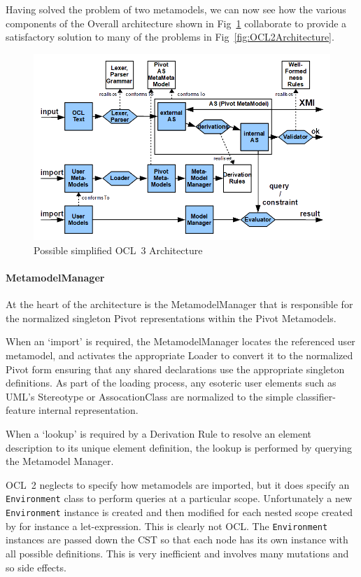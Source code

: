 \documentclass{jot}
\begin{document}
Having solved the problem of two metamodels, we can now see how the various components of the Overall architecture shown in Fig~\ref{fig:OCL3Architecture} collaborate to provide a satisfactory solution to many of the problems in Fig~\ref{fig:OCL2Architecture}. 

\begin{figure}
	\begin{center}
		\includegraphics[width=4.5in]{OCL3Architecture.png}
	\end{center}
	\caption{Possible simplified OCL~3 Architecture}
	\label{fig:OCL3Architecture}
\end{figure}

\paragraph{MetamodelManager}

At the heart of the architecture is the MetamodelManager that is responsible for the normalized singleton Pivot representations within
the Pivot Metamodels.

When an `import' is required, the MetamodelManager locates the referenced user metamodel, and activates the appropriate Loader to convert it to the normalized Pivot form ensuring that any shared declarations use the appropriate singleton definitions. As part of the loading process, any esoteric user elements such as UML's Stereotype or AssocationClass are normalized to the simple classifier-feature internal representation.

When a `lookup' is required by a Derivation Rule to resolve an element description to its unique element definition, the lookup is performed by querying the Metamodel Manager.

OCL~2 neglects to specify how metamodels are imported, but it does specify an \verb$Environment$ class to perform queries at a particular scope. Unfortunately a new \verb$Environment$ instance is created and then modified for each nested scope created by for instance a let-expression. This is clearly not OCL. The \verb$Environment$ instances are passed down the CST so that each node has its own instance with all possible definitions. This is very inefficient and involves many mutations and so side effects.
\end{document}
